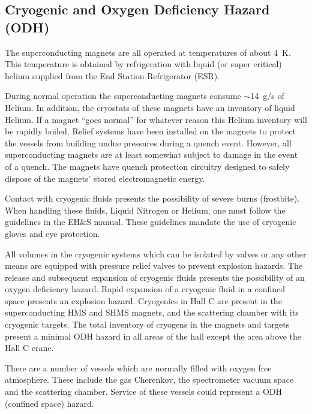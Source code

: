 \begin{safetyen}{0}{0}
\section{Cryogenic and Oxygen Deficiency Hazard (ODH)} 
\label{sec:odhhazard}
\end{safetyen}

The superconducting magnets are all operated at temperatures of about 4~K. 
This temperature is obtained by refrigeration with liquid (or super critical) 
helium supplied from the End Station Refrigerator (ESR).

During normal operation the superconducting magnets consume $\sim$14~g/s of Helium. 
In addition, the cryostats of these magnets have an inventory of liquid Helium. If a magnet ``goes
normal'' for whatever reason this Helium inventory will be rapidly boiled. Relief systems have been 
installed on the magnets to protect the vessels from building undue pressures during a quench event. 
However, all superconducting magnets are at least somewhat subject to damage in the event of a quench. 
The magnets have quench protection circuitry designed to safely dispose of the magnets' 
stored electromagnetic energy.

Contact with cryogenic fluids presents the possibility of severe burns (frostbite). 
When handling these fluids, Liquid Nitrogen or Helium, one must follow the
guidelines in the EH\&S manual\cite{EHScebaf}. These guidelines mandate the use 
of cryogenic gloves and eye protection.

All volumes in the cryogenic systems which can be isolated by valves or any other 
means are equipped with pressure relief valves to prevent explosion hazards.
The release and subsequent expansion of cryogenic fluids presents the possibility 
of an oxygen deficiency hazard. Rapid expansion of a cryogenic fluid in a confined 
space presents an explosion hazard. Cryogenics in Hall C are present in the superconducting 
HMS and SHMS  magnets, and the scattering chamber with its cryogenic targets. The total 
inventory of cryogens in the magnets and targets present a minimal ODH hazard in all 
areas of the hall except the area above the Hall C crane.

There are a number of vessels which are normally filled with oxygen free atmosphere. 
These include the gas Cherenkov, the spectrometer vacuum space and the scattering chamber. 
Service of these vessels could represent a ODH (confined space) hazard.

